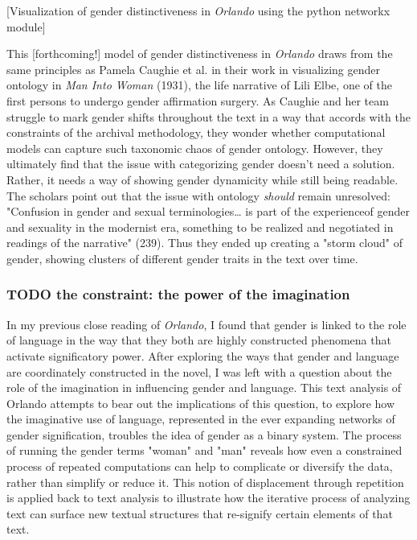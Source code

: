 \documentclass[11pt]{article}
\begin{document}
[Visualization of gender distinctiveness in \emph{Orlando} using the python
networkx module]

This [forthcoming!] model of gender distinctiveness in \emph{Orlando} draws
from the same principles as Pamela Caughie et al. in their work in
visualizing gender ontology in \emph{Man Into Woman} (1931), the life
narrative of Lili Elbe, one of the first persons to undergo gender
affirmation surgery. As Caughie and her team struggle to mark gender
shifts throughout the text in a way that accords with the constraints
of the archival methodology, they wonder whether computational models
can capture such taxonomic chaos of gender ontology. However, they
ultimately find that the issue with categorizing gender doesn't need a
solution. Rather, it needs a way of showing gender dynamicity while
still being readable. The scholars point out that the issue with
ontology \emph{should} remain unresolved: "Confusion in gender and sexual
terminologies\ldots{} is part of the experienceof gender and sexuality in
the modernist era, something to be realized and negotiated in readings
of the narrative" (239). Thus they ended up creating a "storm cloud"
of gender, showing clusters of different gender traits in the text
over time.

\subsubsection{{\bfseries\sffamily TODO} the constraint: the power of the imagination}
\label{sec:org99ece71}

In my previous close reading of \emph{Orlando}, I found that gender is
linked to the role of language in the way that they both are highly
constructed phenomena that activate significatory power. After
exploring the ways that gender and language are coordinately
constructed in the novel, I was left with a question about the role of
the imagination in influencing gender and language. This text analysis
of Orlando attempts to bear out the implications of this question, to
explore how the imaginative use of language, represented in the ever
expanding networks of gender signification, troubles the idea of
gender as a binary system. The process of running the gender terms
"woman" and "man" reveals how even a constrained process of repeated
computations can help to complicate or diversify the data, rather than
simplify or reduce it. This notion of displacement through repetition
is applied back to text analysis to illustrate how the iterative
process of analyzing text can surface new textual structures that
re-signify certain elements of that text.
\end{document}
